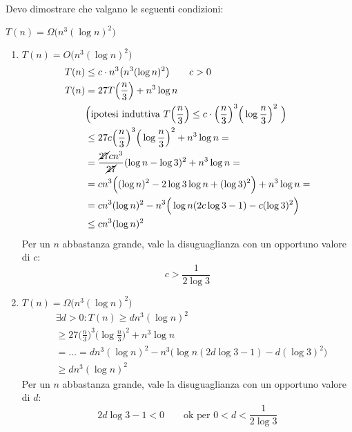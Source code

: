 \begin{itemize}[label=$\bullet$]
    Devo dimostrare che valgano le seguenti condizioni:\par $T(n) = \Omega \big(n^3 (\log n)^2\big)$
    \begin{enumerate}
        \item $T(n) = O \big(n^3 (\log n)^2\big)$
        \begin{align*}
            T(n) & \leq c \cdot n^3 \big(n^3 (\log n)^2\big) \qquad c > 0 \\
            T(n) & = 27T\Big(\frac{n}{3}\Big) + n^3 \log n \qquad \\
            & \Big(\text{ipotesi induttiva } T\Big(\frac{n}{3} \Big) 
                \leq c \cdot \Big(\frac{n}{3} \Big)^3 \Big(\log \frac{n}{3} \Big)^2 \ \Big)\\
            & \leq 27 c \Big(\frac{n}{3} \Big)^3 \Big(\log \frac{n}{3} \Big)^2 + n^3 \log n = \\
            & = \frac{\cancel{27} cn^3}{\cancel{27}} (\log n - \log 3)^2 + n^3 \log n = \\
            & = cn^3 \Big((\log n)^2 - 2\log 3 \log n + (\log 3)^2 \Big) + n^3 \log n = \\
            & = cn^3 (\log n)^2 - n^3 \Big(\log n (2c \log 3 - 1) - c (\log 3)^2 \Big) \\
            & \leq cn^3(\log n)^2
        \end{align*}
        Per un $n$ abbastanza grande, vale la disuguaglianza con un opportuno valore di $c$:
        $$c > \frac{1}{2 \log 3}$$

        \item $T(n) = \Omega \big(n^3 (\log n)^2\big)$
        \begin{align*}
            & \exists d > 0 : T(n) \geq dn^3(\log n)^2 \\
            & \geq 27\Big(\frac{n}{3} \Big)^3 \Big(\log \frac{n}{3} \Big)^2 + n^3 \log n \\
            & = \dots = dn^3 (\log n)^2 - n^3 \Big(\log n (2d \log 3 - 1) - d (\log 3)^2 \Big) \\
            & \geq dn^3 (\log n)^2 
        \end{align*}
        Per un $n$ abbastanza grande, vale la disuguaglianza con un opportuno valore di $d$:
        $$2d\log 3 -1 < 0 \qquad \text{ok per } 0 < d < \frac{1}{2\log 3}$$
    \end{enumerate}
\end{itemize}
